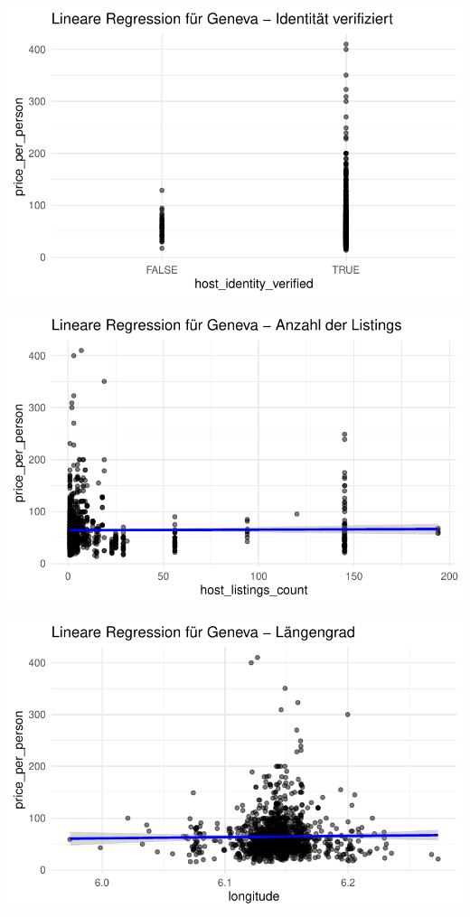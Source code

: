 \documentclass[
  journal,
]{IEEEtran}%
\begin{document}
\includegraphics{main_files/figure-pdf/unnamed-chunk-15-5.pdf}

\includegraphics{main_files/figure-pdf/unnamed-chunk-15-6.pdf}

\includegraphics{main_files/figure-pdf/unnamed-chunk-15-7.pdf}
\end{document}
